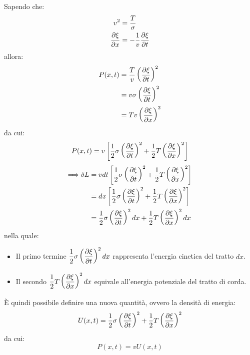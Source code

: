 \documentclass[11pt, a4paper, openright]{book}
\theoremstyle{plain}
\theoremstyle{definition}
\begin{document}
Sapendo che:
\begin{align}
    v^2 & = \frac{T}{\sigma} \\
    \pdv{\xi}{x} & = -\frac{1}{v} \pdv{\xi}{t}
\end{align}
allora:
\begin{align}
    P(x, t) & = \frac{T}{v}\left(\pdv{\xi}{t}\right)^2 \\
            & = v\sigma\left(\pdv{\xi}{t}\right)^2 \\
            & = Tv\left(\pdv{\xi}{x}\right)^2
\end{align}
da cui:
\begin{equation}
    P(x, t) = v\left[\frac{1}{2}\sigma\left(\pdv{\xi}{t}\right)^2 + \frac{1}{2}T\left(\pdv{\xi}{x}\right)^2\right]
\end{equation}
\begin{align}
    \Longrightarrow \delta L & = vdt\left[\frac{1}{2}\sigma\left(\pdv{\xi}{t}\right)^2 + \frac{1}{2}T\left(\pdv{\xi}{x}\right)^2\right] \\
    & = dx\left[\frac{1}{2}\sigma\left(\pdv{\xi}{t}\right)^2 + \frac{1}{2}T\left(\pdv{\xi}{x}\right)^2\right] \\
    & = \frac{1}{2}\sigma\left(\pdv{\xi}{t}\right)^2dx + \frac{1}{2}T\left(\pdv{\xi}{x}\right)^2dx
\end{align}
nella quale:
\begin{itemize}
    \item Il primo termine $\displaystyle \frac{1}{2}\sigma\left(\pdv{\xi}{t}\right)^2dx$ rappresenta l'energia cinetica del tratto $dx$.
    \item Il secondo $\displaystyle \frac{1}{2}T\left(\pdv{\xi}{x}\right)^2dx$ equivale all'energia potenziale del tratto di corda.
\end{itemize}

È quindi possibile definire una nuova quantità, ovvero la densità di energia:
\begin{equation}
    U(x, t) = \frac{1}{2}\sigma\left(\pdv{\xi}{t}\right)^2 + \frac{1}{2}T\left(\pdv{\xi}{x}\right)^2
    \label{eq:densitàDiEnergia}
\end{equation}
da cui:
\begin{equation}
    P(x, t) = vU(x, t)
    \label{eq:potenza}
\end{equation}

\end{document}
